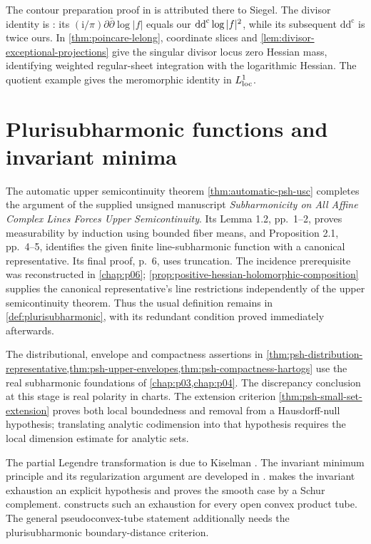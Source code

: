 The contour preparation proof in \cite[Chapter II, Section 2.A, pp.~79--80, Theorem (2.1)]{DemBook} is attributed there to Siegel. The divisor identity is \cite[Chapter III, (2.15), pp.~143--144]{DemBook}: its $(\mathrm{i}/\pi)\partial\bar\partial\log|f|$ equals our $\mathrm{dd}^{\mathrm{c}}\log|f|^2$, while its subsequent $\mathrm{dd}^{\mathrm c}$ is twice ours. In \cref{thm:poincare-lelong}, coordinate slices and \cref{lem:divisor-exceptional-projections} give the singular divisor locus zero Hessian mass, identifying weighted regular-sheet integration with the logarithmic Hessian. The quotient example gives the meromorphic identity in $L^1_{\mathrm{loc}}$.

\section{Plurisubharmonic functions and invariant minima}
\label{sec:history-plurisubharmonic}
The automatic upper semicontinuity theorem \cref{thm:automatic-psh-usc} completes the argument of the supplied unsigned manuscript \emph{Subharmonicity on All Affine Complex Lines Forces Upper Semicontinuity}. Its Lemma 1.2, pp.~1--2, proves measurability by induction using bounded fiber means, and Proposition 2.1, pp.~4--5, identifies the given finite line-subharmonic function with a canonical representative. Its final proof, p.~6, uses truncation. The incidence prerequisite was reconstructed in \cref{chap:p06}; \cref{prop:positive-hessian-holomorphic-composition} supplies the canonical representative's line restrictions independently of the upper semicontinuity theorem. Thus the usual definition remains in \cref{def:plurisubharmonic}, with its redundant condition proved immediately afterwards.

The distributional, envelope and compactness assertions in \cref{thm:psh-distribution-representative,thm:psh-upper-envelopes,thm:psh-compactness-hartogs} use the real subharmonic foundations of \cref{chap:p03,chap:p04}. The discrepancy conclusion at this stage is real polarity in charts. The extension criterion \cref{thm:psh-small-set-extension} proves both local boundedness and removal from a Hausdorff-null hypothesis; translating analytic codimension into that hypothesis requires the local dimension estimate for analytic sets.

The partial Legendre transformation is due to Kiselman \cite{Kis78}. The invariant minimum principle and its regularization argument are developed in \cite[Chapter I, Section 7.B, Theorem (7.5) and its proof, p.~57]{DemBook}.  makes the invariant exhaustion an explicit hypothesis and proves the smooth case by a Schur complement.  constructs such an exhaustion for every open convex product tube. The general pseudoconvex-tube statement additionally needs the plurisubharmonic boundary-distance criterion.


